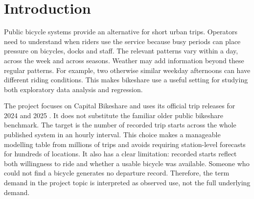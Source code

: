 \documentclass[10pt]{article}
\begin{document}
\printAffiliationsAndNotice{}

\begin{abstract}
This project studies hourly recorded departures in the Capital Bikeshare system using all 24 monthly files from 2024 and 2025. Exploratory analysis describes calendar and weather patterns, while regression compares a weekday--hour mean baseline, Ridge, random forest and histogram gradient boosting. Model settings are selected using expanding time windows within 2024, with 2025 reserved for final testing. On \NTest\ eligible test hours, the validation-selected gradient boosting model with calendar and ERA5 weather features obtains MAE \PrimaryMAE\ and RMSE \PrimaryRMSE\ rides per hour, compared with RMSE \BoostTimeRMSE\ for its calendar-only version. Weather improves this model's test RMSE by \WeatherRMSEGain\%, but errors remain larger at weekday peaks and in hot or wet conditions. The target measures recorded departures rather than unmet demand, and retrospective weather supports estimation conditional on known conditions rather than a verified advance forecasting service.
\end{abstract}

\section{Introduction}
Public bicycle systems provide an alternative for short urban trips. Operators need to understand when riders use the service because busy periods can place pressure on bicycles, docks and staff. The relevant patterns vary within a day, across the week and across seasons. Weather may add information beyond these regular patterns. For example, two otherwise similar weekday afternoons can have different riding conditions. This makes bikeshare use a useful setting for studying both exploratory data analysis and regression.

The project focuses on Capital Bikeshare and uses its official trip releases for 2024 and 2025 \citep{capitaldata}. It does not substitute the familiar older public bikeshare benchmark. The target is the number of recorded trip starts across the whole published system in an hourly interval. This choice makes a manageable modelling table from millions of trips and avoids requiring station-level forecasts for hundreds of locations. It also has a clear limitation: recorded starts reflect both willingness to ride and whether a usable bicycle was available. Someone who could not find a bicycle generates no departure record. Therefore, the term demand in the project topic is interpreted as observed use, not the full underlying demand.
\end{document}
